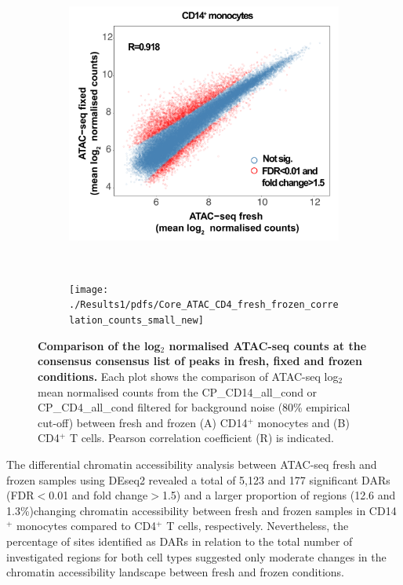 \begin{figure}[H]
\centering
\begin{subfigure}[b]{0.45\textwidth}
\centering 
\includegraphics[width=\textwidth]{./Results1/pdfs/Core_ATAC_CD14_fresh_frozen_correlation_counts_small_new}
\caption{}
\end{subfigure}
~
\begin{subfigure}[b]{0.45\textwidth}
\centering 
\texttt{[image: ./Results1/pdfs/Core\_ATAC\_CD4\_fresh\_frozen\_correlation\_counts\_small\_new]}
\caption{}
\end{subfigure}
\caption[Comparison of the log$_2$ normalised ATAC-seq counts at the consensus list of peaks in fresh and frozen conditions.]{\textbf{Comparison of the log$_2$ normalised ATAC-seq counts at the consensus consensus list of peaks in fresh, fixed and frozen conditions.} Each plot shows the comparison of ATAC-seq log$_2$ mean normalised counts from the CP\_CD14\_all\_cond or CP\_CD4\_all\_cond filtered for background noise (80\% empirical cut-off) between fresh and frozen (A) CD14$^+$ monocytes and (B) CD4$^+$ T cells. Pearson correlation coefficient (R) is indicated.}
\label{figure:Core_ATAC_all-conditions_correlation}
\end{figure}
	


The differential chromatin accessibility analysis between ATAC-seq fresh and frozen samples using DEseq2 revealed a total of 5,123 and 177 significant DARs (FDR$<$0.01 and fold change$>$1.5) and a larger proportion of regions (12.6 and 1.3\%)changing chromatin accessibility between fresh and frozen samples in CD14$^+$ monocytes compared to CD4$^+$ T cells, respectively. Nevertheless, the percentage of sites identified as DARs in relation to the total number of investigated regions for both cell types suggested only moderate changes in the chromatin accessibility landscape between fresh and frozen conditions. 


